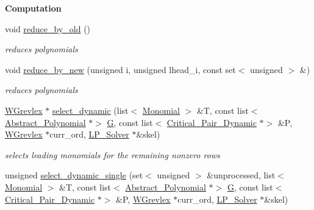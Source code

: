 \begin{Indent}\textbf{ Computation}\par
\begin{DoxyCompactItemize}
\item 
\mbox{\label{group___g_b_computation_a841c43903004e8a8e355bfcf30dfd36c}} 
void \hyperlink{group___g_b_computation_a841c43903004e8a8e355bfcf30dfd36c}{reduce\+\_\+by\+\_\+old} ()
\begin{DoxyCompactList}\small\item\em reduces polynomials \end{DoxyCompactList}\item 
\mbox{\label{group___g_b_computation_a2344b7981a040e2a620b22fc19ef05ec}} 
void \hyperlink{group___g_b_computation_a2344b7981a040e2a620b22fc19ef05ec}{reduce\+\_\+by\+\_\+new} (unsigned i, unsigned lhead\+\_\+i, const set$<$ unsigned $>$ \&)
\begin{DoxyCompactList}\small\item\em reduces polynomials \end{DoxyCompactList}\item 
\hyperlink{group__orderinggroup_class_w_grevlex}{W\+Grevlex} $\ast$ \hyperlink{group___g_b_computation_abcd2fc91687bbbafbf856488d21620d8}{select\+\_\+dynamic} (list$<$ \hyperlink{group__polygroup_class_monomial}{Monomial} $>$ \&T, const list$<$ \hyperlink{group__polygroup_class_abstract___polynomial}{Abstract\+\_\+\+Polynomial} $\ast$$>$ \hyperlink{group___g_b_computation_a3dbc8c690c4a21ba195ae32c19982f79}{G}, const list$<$ \hyperlink{group___g_b_computation_class_critical___pair___dynamic}{Critical\+\_\+\+Pair\+\_\+\+Dynamic} $\ast$$>$ \&P, \hyperlink{group__orderinggroup_class_w_grevlex}{W\+Grevlex} $\ast$curr\+\_\+ord, \hyperlink{group___c_l_s_solvers_class_l_p___solvers_1_1_l_p___solver}{L\+P\+\_\+\+Solver} $\ast$\&skel)
\begin{DoxyCompactList}\small\item\em selects leading monomials for the remaining nonzero rows \end{DoxyCompactList}\item 
unsigned \hyperlink{group___g_b_computation_af50b3f58764474df16c466034515b63e}{select\+\_\+dynamic\+\_\+single} (set$<$ unsigned $>$ \&unprocessed, list$<$ \hyperlink{group__polygroup_class_monomial}{Monomial} $>$ \&T, const list$<$ \hyperlink{group__polygroup_class_abstract___polynomial}{Abstract\+\_\+\+Polynomial} $\ast$$>$ \hyperlink{group___g_b_computation_a3dbc8c690c4a21ba195ae32c19982f79}{G}, const list$<$ \hyperlink{group___g_b_computation_class_critical___pair___dynamic}{Critical\+\_\+\+Pair\+\_\+\+Dynamic} $\ast$$>$ \&P, \hyperlink{group__orderinggroup_class_w_grevlex}{W\+Grevlex} $\ast$curr\+\_\+ord, \hyperlink{group___c_l_s_solvers_class_l_p___solvers_1_1_l_p___solver}{L\+P\+\_\+\+Solver} $\ast$\&skel)

\end{DoxyCompactItemize}
\end{Indent}
